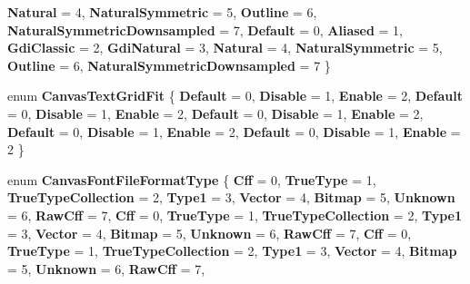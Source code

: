 \begin{DoxyCompactItemize}
{\bfseries Natural} = 4, 
{\bfseries Natural\+Symmetric} = 5, 
{\bfseries Outline} = 6, 
{\bfseries Natural\+Symmetric\+Downsampled} = 7, 
\newline
{\bfseries Default} = 0, 
{\bfseries Aliased} = 1, 
{\bfseries Gdi\+Classic} = 2, 
{\bfseries Gdi\+Natural} = 3, 
\newline
{\bfseries Natural} = 4, 
{\bfseries Natural\+Symmetric} = 5, 
{\bfseries Outline} = 6, 
{\bfseries Natural\+Symmetric\+Downsampled} = 7
 \}
\item 
\mbox{\label{namespace_microsoft_1_1_graphics_1_1_canvas_1_1_text_a7077d2f1ea9a72f9af3d69e5f5e04c20}} 
enum {\bfseries Canvas\+Text\+Grid\+Fit} \{ \newline
{\bfseries Default} = 0, 
{\bfseries Disable} = 1, 
{\bfseries Enable} = 2, 
{\bfseries Default} = 0, 
\newline
{\bfseries Disable} = 1, 
{\bfseries Enable} = 2, 
{\bfseries Default} = 0, 
{\bfseries Disable} = 1, 
\newline
{\bfseries Enable} = 2, 
{\bfseries Default} = 0, 
{\bfseries Disable} = 1, 
{\bfseries Enable} = 2, 
\newline
{\bfseries Default} = 0, 
{\bfseries Disable} = 1, 
{\bfseries Enable} = 2
 \}
\item 
\mbox{\label{namespace_microsoft_1_1_graphics_1_1_canvas_1_1_text_a70ea121d1ef956464e4adf30172f2a87}} 
enum {\bfseries Canvas\+Font\+File\+Format\+Type} \{ \newline
{\bfseries Cff} = 0, 
{\bfseries True\+Type} = 1, 
{\bfseries True\+Type\+Collection} = 2, 
{\bfseries Type1} = 3, 
\newline
{\bfseries Vector} = 4, 
{\bfseries Bitmap} = 5, 
{\bfseries Unknown} = 6, 
{\bfseries Raw\+Cff} = 7, 
\newline
{\bfseries Cff} = 0, 
{\bfseries True\+Type} = 1, 
{\bfseries True\+Type\+Collection} = 2, 
{\bfseries Type1} = 3, 
\newline
{\bfseries Vector} = 4, 
{\bfseries Bitmap} = 5, 
{\bfseries Unknown} = 6, 
{\bfseries Raw\+Cff} = 7, 
\newline
{\bfseries Cff} = 0, 
{\bfseries True\+Type} = 1, 
{\bfseries True\+Type\+Collection} = 2, 
{\bfseries Type1} = 3, 
\newline
{\bfseries Vector} = 4, 
{\bfseries Bitmap} = 5, 
{\bfseries Unknown} = 6, 
{\bfseries Raw\+Cff} = 7, 

\end{DoxyCompactItemize}
